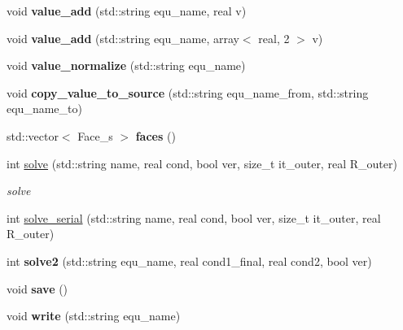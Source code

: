 \begin{DoxyCompactItemize}
\item 
\hypertarget{classProb_aa5c8f3a5c0e9a15e054ca37d150a8921}{
void {\bfseries value\_\-add} (std::string equ\_\-name, real v)}
\label{classProb_aa5c8f3a5c0e9a15e054ca37d150a8921}

\item 
\hypertarget{classProb_a8dd6bf7649956711e74ccc58957186d8}{
void {\bfseries value\_\-add} (std::string equ\_\-name, array$<$ real, 2 $>$ v)}
\label{classProb_a8dd6bf7649956711e74ccc58957186d8}

\item 
\hypertarget{classProb_ad0c1ce9a1ffc181bf289aed404a2bb45}{
void {\bfseries value\_\-normalize} (std::string equ\_\-name)}
\label{classProb_ad0c1ce9a1ffc181bf289aed404a2bb45}

\item 
\hypertarget{classProb_a7bb25a9a766484c678d7e23e4b5ea4a7}{
void {\bfseries copy\_\-value\_\-to\_\-source} (std::string equ\_\-name\_\-from, std::string equ\_\-name\_\-to)}
\label{classProb_a7bb25a9a766484c678d7e23e4b5ea4a7}

\item 
\hypertarget{classProb_ac298114d98ebe5296ede77dafc3f4df3}{
std::vector$<$ Face\_\-s $>$ {\bfseries faces} ()}
\label{classProb_ac298114d98ebe5296ede77dafc3f4df3}

\item 
int \hyperlink{classProb_a35e6fe7ad3c45ef3b922f5212a039887}{solve} (std::string name, real cond, bool ver, size\_\-t it\_\-outer, real R\_\-outer)
\begin{DoxyCompactList}\small\item\em solve \item\end{DoxyCompactList}\item 
int \hyperlink{classProb_a19a0a17f9437a24111f11f215695a33e}{solve\_\-serial} (std::string name, real cond, bool ver, size\_\-t it\_\-outer, real R\_\-outer)
\item 
\hypertarget{classProb_ae50c9b74ff1590305dac1e64988a6d8b}{
int {\bfseries solve2} (std::string equ\_\-name, real cond1\_\-final, real cond2, bool ver)}
\label{classProb_ae50c9b74ff1590305dac1e64988a6d8b}

\item 
\hypertarget{classProb_a187e846a4f4eed21758efaa63ede9ec1}{
void {\bfseries save} ()}
\label{classProb_a187e846a4f4eed21758efaa63ede9ec1}

\item 
\hypertarget{classProb_ad790058d97221b21c665d550650c15ad}{
void {\bfseries write} (std::string equ\_\-name)}
\label{classProb_ad790058d97221b21c665d550650c15ad}

\end{DoxyCompactItemize}

